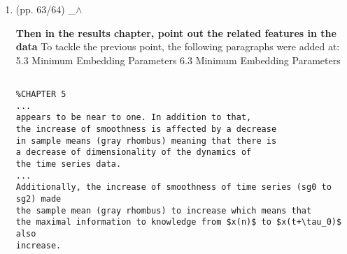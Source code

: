 \documentclass[12pt]{article}
\begin{document}
\begin{enumerate}
	\begin{verbatim}
	

Applying low-pass filters is a common way to either capture low 
frequencies (below 15 Hz) that represent 99\% of the human body 
energy or to get the gravitational and body motion components of 
accelerations (below 0.3 Hz) \citep{anguita2013}.
However, filtering such information can cut-off frequencies that 
are important for the conservation of  
(i) the original properties of raw time-series data and 
(ii) the structure of the time-series data in terms of width and heights.
In addition to that, arm movements of NAO can sometimes produce 
jerky movements due to: 
(i) the control of dynamic response (fast acceleration/deceleration), 
(ii) the stiffness of the gear mechanism, or 
(iii) the high frequencies of oscillations because of resonances
(see Appendix \ref{appendix:nao} for NAO's mechanical and dynamic 
capabilities). 
Hence, instead of cutting out frequencies with a low-pass filter
for the experiments in the context of human-robot interaction, 
this thesis considers the application of Savitzky-Golay filter 
to smooth time series data in order 
to give insight into the effect of smoothness of real-world 
time series data with methods of nonlinear analysis.




	\end{verbatim}
	\textit{
	SORTED:  \\
	Sat Apr 20 14:12:27 BST 2019\\
	Mon  6 May 17:31:45 BST 2019 (amended)
	}
	\\





\item  (pp. 63/64)  \_$\wedge$  

\textbf{
Then in the results chapter, 
point out the related features in the data
}
To tackle the previous point, the following paragraphs were added at:
5.3 Minimum Embedding Parameters
6.3 Minimum Embedding Parameters

	\begin{verbatim}

%CHAPTER 5	
...
appears to be near to one. In addition to that, 
the increase of smoothness is affected by a decrease 
in sample means (gray rhombus) meaning that there is 
a decrease of dimensionality of the dynamics of 
the time series data.
...
Additionally, the increase of smoothness of time series (sg0 to sg2) made 
the sample mean (gray rhombus) to increase which means that 
the maximal information to knowledge from $x(n)$ to $x(t+\tau_0)$ also 
increase.



\end{verbatim}
\end{enumerate}
\end{document}
